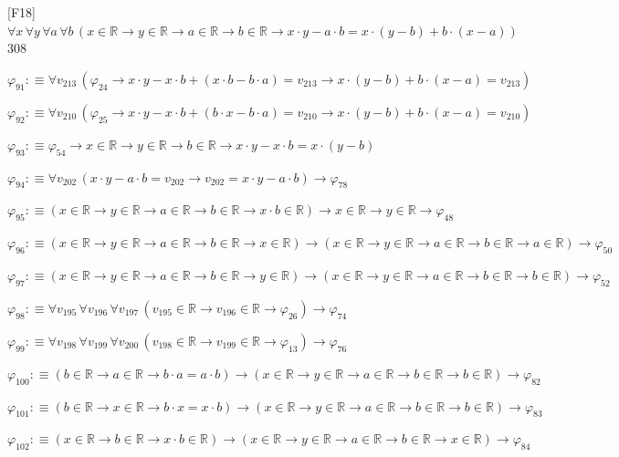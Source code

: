 \begin{fullproof}{[F18]}{$\forall x\,\forall y\,\forall a\,\forall b\,(x \in \mathbb{R} \to y \in \mathbb{R} \to a \in \mathbb{R} \to b \in \mathbb{R} \to x \cdot y - a \cdot b = x \cdot (y - b) + b \cdot (x - a))$}{308}
\begin{abbrevlist}
\item $\varphi_{91} :\equiv \forall v_{213}\,(\varphi_{24} \to x \cdot y - x \cdot b + (x \cdot b - b \cdot a) = v_{213} \to x \cdot (y - b) + b \cdot (x - a) = v_{213})$
\item $\varphi_{92} :\equiv \forall v_{210}\,(\varphi_{25} \to x \cdot y - x \cdot b + (b \cdot x - b \cdot a) = v_{210} \to x \cdot (y - b) + b \cdot (x - a) = v_{210})$
\item $\varphi_{93} :\equiv \varphi_{54} \to x \in \mathbb{R} \to y \in \mathbb{R} \to b \in \mathbb{R} \to x \cdot y - x \cdot b = x \cdot (y - b)$
\item $\varphi_{94} :\equiv \forall v_{202}\,(x \cdot y - a \cdot b = v_{202} \to v_{202} = x \cdot y - a \cdot b) \to \varphi_{78}$
\item $\varphi_{95} :\equiv (x \in \mathbb{R} \to y \in \mathbb{R} \to a \in \mathbb{R} \to b \in \mathbb{R} \to x \cdot b \in \mathbb{R}) \to x \in \mathbb{R} \to y \in \mathbb{R} \to \varphi_{48}$
\item $\varphi_{96} :\equiv (x \in \mathbb{R} \to y \in \mathbb{R} \to a \in \mathbb{R} \to b \in \mathbb{R} \to x \in \mathbb{R}) \to (x \in \mathbb{R} \to y \in \mathbb{R} \to a \in \mathbb{R} \to b \in \mathbb{R} \to a \in \mathbb{R}) \to \varphi_{50}$
\item $\varphi_{97} :\equiv (x \in \mathbb{R} \to y \in \mathbb{R} \to a \in \mathbb{R} \to b \in \mathbb{R} \to y \in \mathbb{R}) \to (x \in \mathbb{R} \to y \in \mathbb{R} \to a \in \mathbb{R} \to b \in \mathbb{R} \to b \in \mathbb{R}) \to \varphi_{52}$
\item $\varphi_{98} :\equiv \forall v_{195}\,\forall v_{196}\,\forall v_{197}\,(v_{195} \in \mathbb{R} \to v_{196} \in \mathbb{R} \to \varphi_{26}) \to \varphi_{74}$
\item $\varphi_{99} :\equiv \forall v_{198}\,\forall v_{199}\,\forall v_{200}\,(v_{198} \in \mathbb{R} \to v_{199} \in \mathbb{R} \to \varphi_{13}) \to \varphi_{76}$
\item $\varphi_{100} :\equiv (b \in \mathbb{R} \to a \in \mathbb{R} \to b \cdot a = a \cdot b) \to (x \in \mathbb{R} \to y \in \mathbb{R} \to a \in \mathbb{R} \to b \in \mathbb{R} \to b \in \mathbb{R}) \to \varphi_{82}$
\item $\varphi_{101} :\equiv (b \in \mathbb{R} \to x \in \mathbb{R} \to b \cdot x = x \cdot b) \to (x \in \mathbb{R} \to y \in \mathbb{R} \to a \in \mathbb{R} \to b \in \mathbb{R} \to b \in \mathbb{R}) \to \varphi_{83}$
\item $\varphi_{102} :\equiv (x \in \mathbb{R} \to b \in \mathbb{R} \to x \cdot b \in \mathbb{R}) \to (x \in \mathbb{R} \to y \in \mathbb{R} \to a \in \mathbb{R} \to b \in \mathbb{R} \to x \in \mathbb{R}) \to \varphi_{84}$

\end{abbrevlist}
\end{fullproof}
